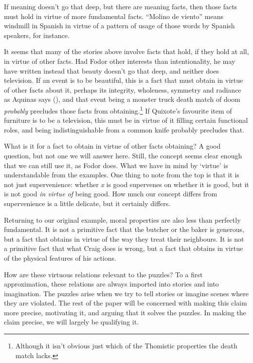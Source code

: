 \documentclass[
  10pt,
  letterpaper,
  DIV=11,
  numbers=noendperiod,
  twoside]{scrartcl}
\begin{document}
If meaning doesn't go that deep, but there are meaning facts, then those
facts must hold in virtue of more fundamental facts. ``Molino de
viento'' means windmill in Spanish in virtue of a pattern of usage of
those words by Spanish speakers, for instance.

It seems that many of the stories above involve facts that hold, if they
hold at all, in virtue of other facts. Had Fodor other interests than
intentionality, he may have written instead that beauty doesn't go that
deep, and neither does television. If an event is to be beautiful, this
is a fact that must obtain in virtue of other facts about it, perhaps
its integrity, wholeness, symmetry and radiance as Aquinas says
(), and that event being a
monster truck death match of doom \emph{probably} precludes those facts
from obtaining.\footnote{Although it isn't obvious just which of the
  Thomistic properties the death match lacks.} If Quixote's favourite
item of furniture is to be a television, this must be in virtue of it
filling certain functional roles, and being indistinguishable from a
common knife probably precludes that.

What is it for a fact to obtain in virtue of other facts obtaining? A
good question, but not one we will answer here. Still, the concept seems
clear enough that we can still use it, as Fodor does. What we have in
mind by `virtue' is understandable from the examples. One thing to note
from the top is that it is not just supervenience: whether \emph{x} is
good supervenes on whether it is good, but it is not good \emph{in
virtue of} being good. How much our concept differs from supervenience
is a little delicate, but it certainly differs.

Returning to our original example, moral properties are also less than
perfectly fundamental. It is not a primitive fact that the butcher or
the baker is generous, but a fact that obtains in virtue of the way they
treat their neighbours. It is not a primitive fact that what Craig does
is wrong, but a fact that obtains in virtue of the physical features of
his actions.

How are these virtuous relations relevant to the puzzles? To a first
approximation, these relations are always imported into stories and into
imagination. The puzzles arise when we try to tell stories or imagine
scenes where they are violated. The rest of the paper will be concerned
with making this claim more precise, motivating it, and arguing that it
solves the puzzles. In making the claim precise, we will largely be
qualifying it.
\end{document}

